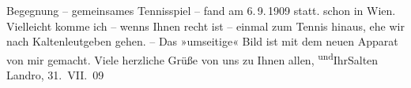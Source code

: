 \begin{ledgroupsized}[t]{13cm}
{{{                  Begegnung – gemeinsames Tennisspiel – fand am 6. 9. 1909 statt.}}}\label{K_L03505-1h} schon in Wien. Vielleicht
               komme ich – wenns Ihnen recht ist – einmal zum Tennis hinaus, ehe wir nach Kaltenleutgeben gehen. – Das »umseitige« Bild
               ist mit dem neuen Apparat von mir gemacht. Viele herzliche Grüße von uns zu Ihnen
                  allen, \substVorne{}\textsuperscript{und}\substDazwischen{}Ihr\substHinten{}{ }\spacefill\mbox{Salten}\pend
           \pstart
           Landro, 31. VII. 09\pend
           
         
         \endnumbering{}\end{ledgroupsized}  \newcommand{\dateiname}{L03505}\newcommand{\titel}{Felix Salten an Arthur Schnitzler, 31. 7. 1909}\newcommand{\editorInnen}{Martin Anton Müller und Laura Untner}
      